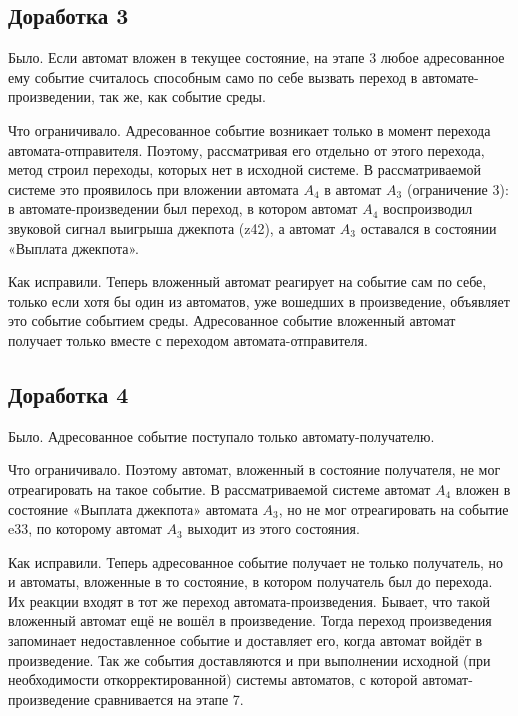 \documentclass[12pt]{article}
\begin{document}
\subsection*{Доработка 3}

Было. Если автомат вложен в текущее состояние, на этапе 3 любое адресованное ему событие считалось способным само по себе вызвать переход в автомате-произведении, так же, как событие среды.

Что ограничивало. Адресованное событие возникает только в момент перехода автомата-отправителя. Поэтому, рассматривая его отдельно от этого перехода, метод строил переходы, которых нет в исходной системе. В рассматриваемой системе это проявилось при вложении автомата $A_{4}$ в автомат $A_{3}$ (ограничение 3): в автомате-произведении был переход, в котором автомат $A_{4}$ воспроизводил звуковой сигнал выигрыша джекпота (z42), а автомат $A_{3}$ оставался в состоянии «Выплата джекпота».

Как исправили. Теперь вложенный автомат реагирует на событие сам по себе, только если хотя бы один из автоматов, уже вошедших в произведение, объявляет это событие событием среды. Адресованное событие вложенный автомат получает только вместе с переходом автомата-отправителя.

\subsection*{Доработка 4}

Было. Адресованное событие поступало только автомату-получателю.

Что ограничивало. Поэтому автомат, вложенный в состояние получателя, не мог отреагировать на такое событие. В рассматриваемой системе автомат $A_{4}$ вложен в состояние «Выплата джекпота» автомата $A_{3}$, но не мог отреагировать на событие e33, по которому автомат $A_{3}$ выходит из этого состояния.

Как исправили. Теперь адресованное событие получает не только получатель, но и автоматы, вложенные в то состояние, в котором получатель был до перехода. Их реакции входят в тот же переход автомата-произведения. Бывает, что такой вложенный автомат ещё не вошёл в произведение. Тогда переход произведения запоминает недоставленное событие и доставляет его, когда автомат войдёт в произведение. Так же события доставляются и при выполнении исходной (при необходимости откорректированной) системы автоматов, с которой автомат-произведение сравнивается на этапе 7.
\end{document}
